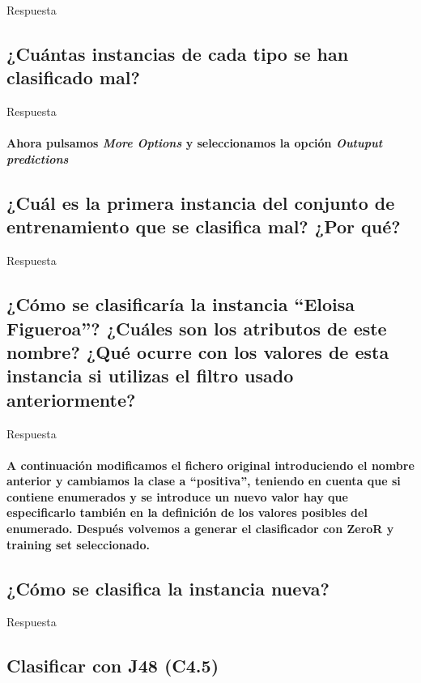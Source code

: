 \documentclass[12pt]{article}
\begin{document}
Respuesta

\subsection{¿Cuántas instancias de cada tipo se han clasificado mal?}

Respuesta

\paragraph{Ahora pulsamos \emph{More Options} y seleccionamos la opción
\emph{Outuput predictions}}
\subsection{¿Cuál es la primera instancia del conjunto de entrenamiento que se
clasifica mal? ¿Por qué?}

Respuesta

\subsection{¿Cómo se clasificaría la instancia ``Eloisa Figueroa''? ¿Cuáles son
los atributos de este nombre? ¿Qué ocurre con los valores de esta instancia
si utilizas el filtro usado anteriormente?}

Respuesta

\paragraph{A continuación modificamos el fichero original introduciendo el nombre
anterior y cambiamos la clase a ``positiva'', teniendo en cuenta que si contiene
enumerados y se introduce un nuevo valor hay que especificarlo también en la
definición de los valores posibles del enumerado. Después volvemos a generar el
clasificador con ZeroR y training set seleccionado.}
\subsection{¿Cómo se clasifica la instancia nueva?}

Respuesta

\newpage

\begin{center}
\section{Clasificar con J48 (C4.5)}
\end{center}
\end{document}
